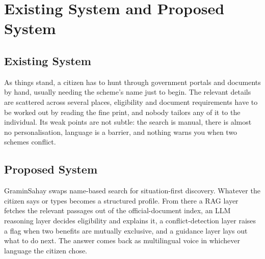 \documentclass[conference]{IEEEtran}
\begin{document}
\section{Existing System and Proposed System}
\label{sec:systems}
\subsection{Existing System}
As things stand, a citizen has to hunt through government portals and documents by hand, usually needing the scheme's name just to begin. The relevant details are scattered across several places, eligibility and document requirements have to be worked out by reading the fine print, and nobody tailors any of it to the individual. Its weak points are not subtle: the search is manual, there is almost no personalisation, language is a barrier, and nothing warns you when two schemes conflict.

\subsection{Proposed System}
GraminSahay swaps name-based search for situation-first discovery. Whatever the citizen says or types becomes a structured profile. From there a RAG layer fetches the relevant passages out of the official-document index, an LLM reasoning layer decides eligibility and explains it, a conflict-detection layer raises a flag when two benefits are mutually exclusive, and a guidance layer lays out what to do next. The answer comes back as multilingual voice in whichever language the citizen chose.
\end{document}

